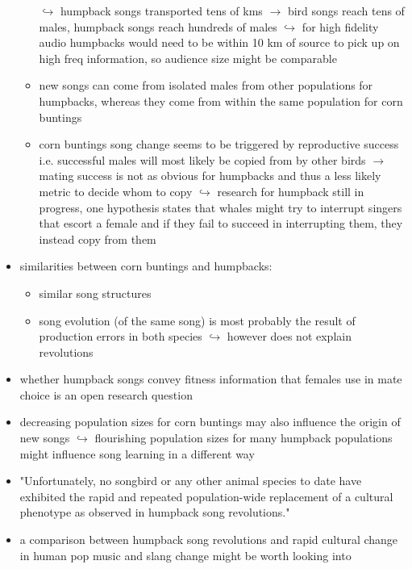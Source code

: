 \documentclass[12pt,a4paper]{article}
\begin{document}
\begin{itemize}
\begin{itemize}
    \newline \indent $\hookrightarrow$ humpback songs transported tens of kms
    \newline \indent $\longrightarrow$ bird songs reach tens of males, humpback songs reach hundreds of males
    \newline \indent $\hookrightarrow$ for high fidelity audio humpbacks would need to be within 10 km of source to pick up on high freq information, so audience size might be comparable 
    \item new songs can come from isolated males from other populations for humpbacks, whereas they come from within the same population for corn buntings
    \item corn buntings song change seems to be triggered by reproductive success i.e. successful males will most likely be copied from by other birds
    \newline \indent $\longrightarrow$ mating success is not as obvious for humpbacks and thus a less likely metric to decide whom to copy
    \newline \indent $\hookrightarrow$ research for humpback still in progress, one hypothesis states that whales might try to interrupt singers that escort a female and if they fail to succeed in interrupting them, they instead copy from them 
  \end{itemize}
  \item similarities between corn buntings and humpbacks:
  \begin{itemize}
    \item similar song structures
    \item song evolution (of the same song) is most probably the result of production errors in both species
    \newline \indent $\hookrightarrow$ however does not explain revolutions
  \end{itemize}
  \item whether humpback songs convey fitness information that females use in mate choice is an open research question
  \item decreasing population sizes for corn buntings may also influence the origin of new songs
  \newline \indent $\hookrightarrow$ flourishing population sizes for many humpback populations might influence song learning in a different way 
  \item "Unfortunately, no songbird or any other animal species to date have exhibited the rapid and repeated population-wide replacement of a cultural phenotype as observed in humpback song revolutions."
  \item a comparison between humpback song revolutions and rapid cultural change in human pop music and slang change might be worth looking into
\end{itemize}
    
\end{document}
